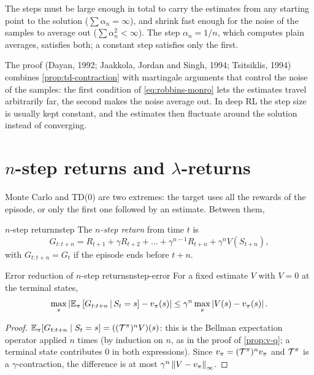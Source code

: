 \begin{intuition}
  The steps must be large enough in total to carry the estimates from any
  starting point to the solution ($\sum \alpha_n = \infty$), and shrink
  fast enough for the noise of the samples to average out ($\sum \alpha_n^2
  < \infty$). The step $\alpha_n = 1/n$, which computes plain averages,
  satisfies both; a constant step satisfies only the first.
\end{intuition}

The proof (Dayan, 1992; Jaakkola, Jordan and Singh, 1994; Tsitsiklis, 1994)
combines \cref{prop:td-contraction} with martingale arguments that control
the noise of the samples: the first condition of \eqref{eq:robbins-monro}
lets the estimates travel arbitrarily far, the second makes the noise
average out. In deep RL the step size is usually kept constant, and the
estimates then fluctuate around the solution instead of converging.

\section{$n$-step returns and $\lambda$-returns}

Monte Carlo and TD(0) are two extremes: the target uses all the rewards of
the episode, or only the first one followed by an estimate. Between them,
\begin{definition}{$n$-step return}{nstep}
  The \emph{$n$-step return} from time $t$ is
  \begin{equation}
    G_{t:t+n} = R_{t+1} + \gamma R_{t+2} + \dots + \gamma^{n-1} R_{t+n} +
    \gamma^n V(S_{t+n}),
  \end{equation}
  with $G_{t:t+n} = G_t$ if the episode ends before $t + n$.
\end{definition}

\begin{proposition}{Error reduction of $n$-step returns}{nstep-error}
  For a fixed estimate $V$ with $V = 0$ at the terminal states,
  \begin{equation}
    \max_s \left\lvert \mathbb{E}_\pi\left[G_{t:t+n} \,\middle|\, S_t = s\right] - v_\pi(s) \right\rvert
    \leq \gamma^n \max_s \left\lvert V(s) - v_\pi(s) \right\rvert.
  \end{equation}
\end{proposition}

\begin{proof}
  $\mathbb{E}_\pi[G_{t:t+n} \mid S_t = s] = ((\mathcal{T}^\pi)^n V)(s)$: this is the
  Bellman expectation operator applied $n$ times (by induction on $n$, as in
  the proof of \cref{prop:v-q}; a terminal state contributes $0$ in both
  expressions). Since $v_\pi = (\mathcal{T}^\pi)^n v_\pi$ and $\mathcal{T}^\pi$ is a
  $\gamma$-contraction, the difference is at most $\gamma^n \left\lVert V -
  v_\pi \right\rVert_\infty$.
\end{proof}


